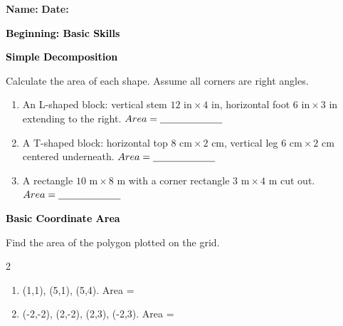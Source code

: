 \documentclass[12pt, letterpaper, fleqn]{article}
\newcommand{\blank}{\underline{\hspace{2.2cm}}}
\begin{document}
\textbf{Name:} \underline{\hspace{5cm}}
\hfill
\textbf{Date:} \underline{\hspace{3cm}}\\

\begin{tcolorbox}[colback=customteal!20]
    \large\textcolor{black}{\textbf{Beginning: Basic Skills}}
\end{tcolorbox}

\vspace{3mm}

\begin{tcolorbox}[colback=customteal!20]
\large\textcolor{black}{\textbf{Simple Decomposition}}
\end{tcolorbox}

\noindent
Calculate the area of each shape. Assume all corners are right angles.

\vspace{3mm}
\begin{enumerate}[itemsep=1cm, leftmargin=0.6cm]
\item An L-shaped block: vertical stem $12\text{ in} \times 4\text{ in}$, horizontal foot $6\text{ in} \times 3\text{ in}$ extending to the right. $Area = \blank$
\item A T-shaped block: horizontal top $8\text{ cm} \times 2\text{ cm}$, vertical leg $6\text{ cm} \times 2\text{ cm}$ centered underneath. $Area = \blank$
\item A rectangle $10\text{ m} \times 8\text{ m}$ with a corner rectangle $3\text{ m} \times 4\text{ m}$ cut out. $Area = \blank$
\end{enumerate}
\newpage

\begin{tcolorbox}[colback=customteal!20]
\large\textcolor{black}{\textbf{Basic Coordinate Area}}
\end{tcolorbox}

\noindent
Find the area of the polygon plotted on the grid.

\vspace{3mm}
\begin{multicols}{2}
\begin{enumerate}[itemsep=1cm, leftmargin=0.6cm]
\item {} (1,1), (5,1), (5,4). Area = \blank
\item {} (-2,-2), (2,-2), (2,3), (-2,3). Area = \blank
\end{enumerate}
\end{multicols}
\newpage
\end{document}
